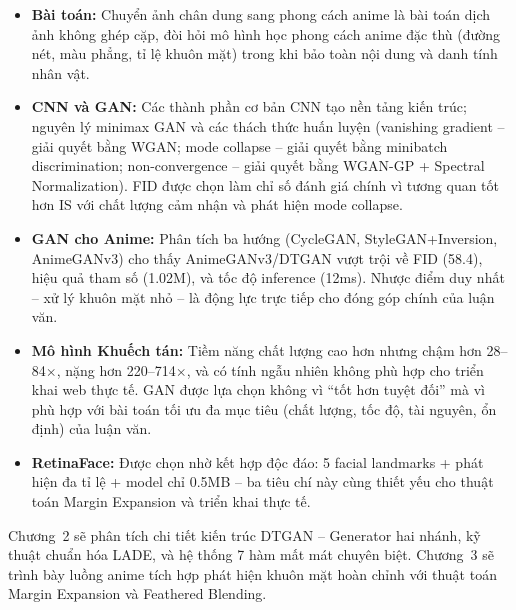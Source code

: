 \begin{itemize}
    \item \textbf{Bài toán:} Chuyển ảnh chân dung sang phong cách anime là bài toán dịch ảnh không ghép cặp, đòi hỏi mô hình học phong cách anime đặc thù (đường nét, màu phẳng, tỉ lệ khuôn mặt) trong khi bảo toàn nội dung và danh tính nhân vật.

    \item \textbf{CNN và GAN:} Các thành phần cơ bản CNN tạo nền tảng kiến trúc; nguyên lý minimax GAN và các thách thức huấn luyện (vanishing gradient -- giải quyết bằng WGAN; mode collapse -- giải quyết bằng minibatch discrimination; non-convergence -- giải quyết bằng WGAN-GP + Spectral Normalization). FID được chọn làm chỉ số đánh giá chính vì tương quan tốt hơn IS với chất lượng cảm nhận và phát hiện mode collapse.

    \item \textbf{GAN cho Anime:} Phân tích ba hướng (CycleGAN, StyleGAN+Inversion, AnimeGANv3) cho thấy AnimeGANv3/DTGAN vượt trội về FID (58.4), hiệu quả tham số (1.02M), và tốc độ inference (12ms). Nhược điểm duy nhất -- xử lý khuôn mặt nhỏ -- là động lực trực tiếp cho đóng góp chính của luận văn.

    \item \textbf{Mô hình Khuếch tán:} Tiềm năng chất lượng cao hơn nhưng chậm hơn 28--84$\times$, nặng hơn 220--714$\times$, và có tính ngẫu nhiên không phù hợp cho triển khai web thực tế. GAN được lựa chọn không vì ``tốt hơn tuyệt đối'' mà vì phù hợp với bài toán tối ưu đa mục tiêu (chất lượng, tốc độ, tài nguyên, ổn định) của luận văn.

    \item \textbf{RetinaFace:} Được chọn nhờ kết hợp độc đáo: 5 facial landmarks + phát hiện đa tỉ lệ + model chỉ 0.5MB -- ba tiêu chí này cùng thiết yếu cho thuật toán Margin Expansion và triển khai thực tế.
\end{itemize}

Chương~2 sẽ phân tích chi tiết kiến trúc DTGAN -- Generator hai nhánh, kỹ thuật chuẩn hóa LADE, và hệ thống 7 hàm mất mát chuyên biệt. Chương~3 sẽ trình bày luồng anime tích hợp phát hiện khuôn mặt hoàn chỉnh với thuật toán Margin Expansion và Feathered Blending.


